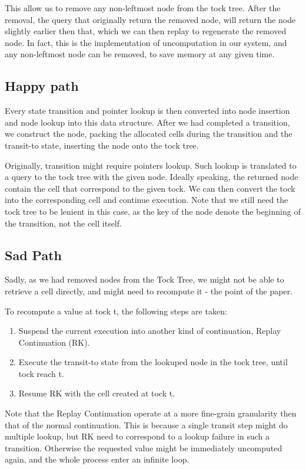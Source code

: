 This allow us to remove any non-leftmost node from the tock tree. After the removal, the query that originally return the removed node, will return the node slightly earlier then that, which we can then replay to regenerate the removed node. In fact, this is the implementation of uncomputation in our system, and any non-leftmost node can be removed, to save memory at any given time.
\subsection{Happy path}
Every state transition and pointer lookup is then converted into node insertion and node lookup into this data structure. After we had completed a transition, we construct the node, packing the allocated cells during the transition and the transit-to state, inserting the node onto the tock tree.

Originally, transition might require pointers lookup. Such lookup is translated to a query to the tock tree with the given node. Ideally speaking, the returned node contain the cell that correspond to the given tock. We can then convert the tock into the corresponding cell and continue execution. Note that we still need the tock tree to be lenient in this case, as the key of the node denote the beginning of the transition, not the cell itself.
\subsection{Sad Path}
Sadly, as we had removed nodes from the Tock Tree, we might not be able to retrieve a cell directly, and might need to recompute it - the point of the paper.

To recompute a value at tock t, the following steps are taken:
\begin{enumerate}
	\item Suspend the current execution into another kind of continuation, Replay Continuation (RK).
	\item Execute the transit-to state from the lookuped node in the tock tree, until tock reach t.
	\item Resume RK with the cell created at tock t.
\end{enumerate}
Note that the Replay Continuation operate at a more fine-grain granularity then that of the normal continuation. This is because a single transit step might do multiple lookup, but RK need to correspond to a lookup failure in such a transition. Otherwise the requested value might be immediately uncomputed again, and the whole process enter an infinite loop.


